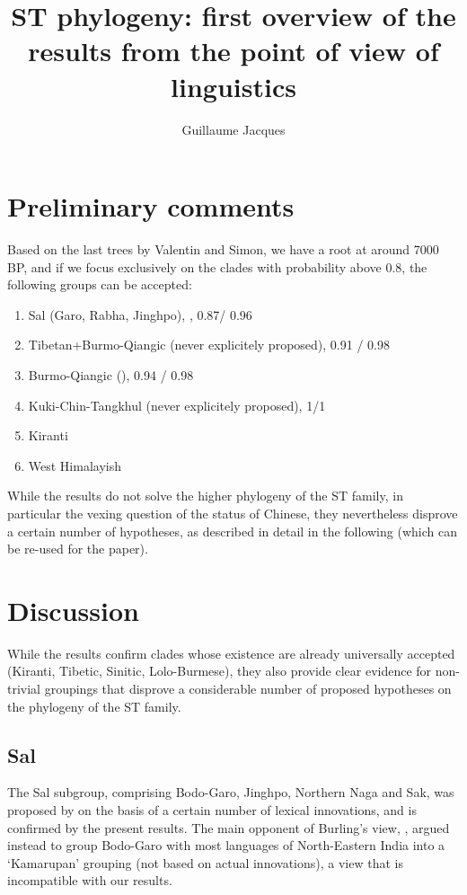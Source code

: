 \documentclass[oneside,a4paper,11pt]{article}
\begin{document}
\title{ST phylogeny: first overview of the results from the point of view of linguistics}
\author{Guillaume Jacques}
\maketitle

\section{Preliminary comments}
Based on the last trees by Valentin and Simon, we have a root at around 7000 BP, and if we focus exclusively on the clades with probability above 0.8, the following groups can be accepted:

\begin{enumerate}
\item Sal (Garo, Rabha, Jinghpo), \citet{burling83sal}, 0.87/ 0.96
\item Tibetan+Burmo-Qiangic (never explicitely proposed), 0.91 / 0.98
\item Burmo-Qiangic (\citealt{jacques.michaud11naish, jacques14esquisse}), 0.94 / 0.98
\item Kuki-Chin-Tangkhul (never explicitely proposed), 1/1
\item Kiranti 
\item West Himalayish
\end{enumerate}

While the results do not solve the higher phylogeny of the ST family, in particular the vexing question of the status of Chinese, they nevertheless disprove a certain number of hypotheses, as described in detail in the following (which can be re-used for the paper).
 
\section{Discussion}
While the results confirm clades whose existence are already universally accepted (Kiranti, Tibetic, Sinitic, Lolo-Burmese), they also provide clear evidence for non-trivial groupings that disprove a considerable number of proposed hypotheses on the phylogeny of the ST family.

\subsection{Sal}
The Sal subgroup, comprising Bodo-Garo, Jinghpo, Northern Naga and Sak, was proposed by \citet{burling83sal} on the basis of a certain number of lexical innovations, and is confirmed by the present results. The main opponent of Burling's view, \citet{matisoff03}, argued instead to group Bodo-Garo with most languages of North-Eastern India into a `Kamarupan' grouping (not based on actual innovations), a view that is incompatible with our results.
\end{document}
